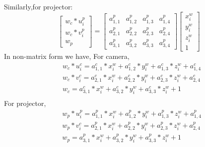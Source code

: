 \noindent
Similarly,for projector:
\begin{equation}
\begin{bmatrix}
w_c*u_i^p \\
w_c*v_i^p \\
w_p
\end{bmatrix}
=\begin{bmatrix}
a_{1,1}^p & a_{1,2}^p & a_{1,3}^p & a_{1,4}^p \\
a_{2,1}^p & a_{2,2}^p & a_{2,3}^p & a_{2,4}^p \\
a_{3,1}^p & a_{3,2}^p & a_{3,3}^p & a_{3,4}^p 
\end{bmatrix}
\begin{bmatrix}
x_i^w\\
y_i^w\\
z_i^w\\
1
\end{bmatrix}
\end{equation}
\noindent
In non-matrix form we have,\newline
\noindent
For camera,
\begin{equation}
\begin{aligned}
& w_c*u_i^c=a_{1,1}^c*x_i^w+a_{1,2}^c*y_i^w+a_{1,3}^c*z_i^w+a_{1,4}^c \\
& w_c*v_i^c=a_{2,1}^c*x_i^w+a_{2,2}^c*y_i^w+a_{2,3}^c*z_i^w+a_{2,4}^c \\
& w_c=a_{3,1}^c*x_i^w+a_{3,2}^c*y_i^w+a_{3,3}^c*z_i^w +1 \\
\end{aligned}
\end{equation}
\noindent
For projector,
\begin{equation}
\begin{aligned}
& w_p*u_i^p=a_{1,1}^p*x_i^w+a_{1,2}^p*y_i^w+a_{1,3}^p*z_i^w+a_{1,4}^p \\
& w_p*v_i^c=a_{2,1}^p*x_i^w+a_{2,2}^p*y_i^w+a_{2,3}^p*z_i^w+a_{2,4}^p \\
& w_p=a_{3,1}^p*x_i^w+a_{3,2}^p*y_i^w+a_{3,3}^p*z_i^w +1 \\
\end{aligned}
\end{equation}\newline


